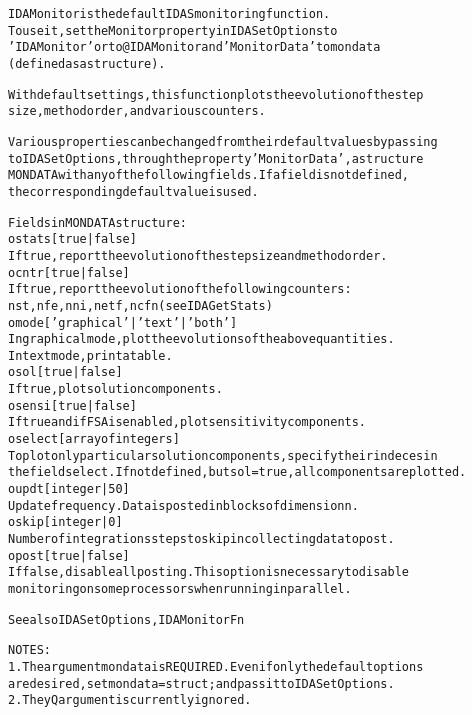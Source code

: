 \begin{alltt}
IDAMonitor is the default IDAS monitoring function.
   To use it, set the Monitor property in IDASetOptions to
   'IDAMonitor' or to @IDAMonitor and 'MonitorData' to mondata
   (defined as a structure).
  
   With default settings, this function plots the evolution of the step 
   size, method order, and various counters.
   
   Various properties can be changed from their default values by passing
   to IDASetOptions, through the property 'MonitorData', a structure
   MONDATA with any of the following fields. If a field is not defined, 
   the corresponding default value is used.

   Fields in MONDATA structure:
     o stats [ {true} | false ]
         If true, report the evolution of the step size and method order.
     o cntr [ {true} | false ]
         If true, report the evolution of the following counters:
         nst, nfe, nni, netf, ncfn (see IDAGetStats)
     o mode [ {'graphical'} | 'text' | 'both' ] 
         In graphical mode, plot the evolutions of the above quantities.
         In text mode, print a table.
     o sol  [ true | {false} ]
         If true, plot solution components.
     o sensi [ true | {false} ]
         If true and if FSA is enabled, plot sensitivity components.
     o select [ array of integers ]
         To plot only particular solution components, specify their indeces in
         the field select. If not defined, but sol=true, all components are plotted.
     o updt [ integer | {50} ]
         Update frequency. Data is posted in blocks of dimension n.
     o skip [ integer | {0} ]
         Number of integrations steps to skip in collecting data to post.
     o post [ {true} | false ]
         If false, disable all posting. This option is necessary to disable
         monitoring on some processors when running in parallel.

   See also IDASetOptions, IDAMonitorFn

   NOTES:
     1. The argument mondata is REQUIRED. Even if only the default options
        are desired, set mondata=struct; and pass it to IDASetOptions.
     2. The yQ argument is currently ignored.
\end{alltt}


 


 



\vspace{0.1in}